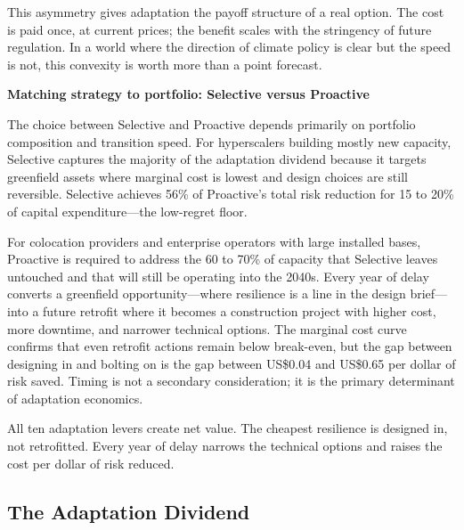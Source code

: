 \begin{twocolbody}
This asymmetry gives adaptation the payoff structure of a real option. The cost is paid once, at current prices; the benefit scales with the stringency of future regulation. In a world where the direction of climate policy is clear but the speed is not, this convexity is worth more than a point forecast.

\vspace{2.5mm}

{\color{SEGreen}\textbf{Matching strategy to portfolio: Selective versus Proactive}}

\vspace{1mm}

\noindent The choice between Selective and Proactive depends primarily on portfolio composition and transition speed. For hyperscalers building mostly new capacity, Selective captures the majority of the adaptation dividend because it targets greenfield assets where marginal cost is lowest and design choices are still reversible. Selective achieves 56\% of Proactive's total risk reduction for 15 to 20\% of capital expenditure---the low-regret floor.

For colocation providers and enterprise operators with large installed bases, Proactive is required to address the 60 to 70\% of capacity that Selective leaves untouched and that will still be operating into the 2040s. Every year of delay converts a greenfield opportunity---where resilience is a line in the design brief---into a future retrofit where it becomes a construction project with higher cost, more downtime, and narrower technical options. The marginal cost curve confirms that even retrofit actions remain below break-even, but the gap between designing in and bolting on is the gap between US\$0.04 and US\$0.65 per dollar of risk saved. Timing is not a secondary consideration; it is the primary determinant of adaptation economics.

\end{twocolbody}

\begin{pullquote}
All ten adaptation levers create net value. The cheapest resilience is designed in, not retrofitted. Every year of delay narrows the technical options and raises the cost per dollar of risk reduced.
\end{pullquote}

\clearpage\thispagestyle{chapterstart}

\subsection*{The Adaptation Dividend}
\greensep

